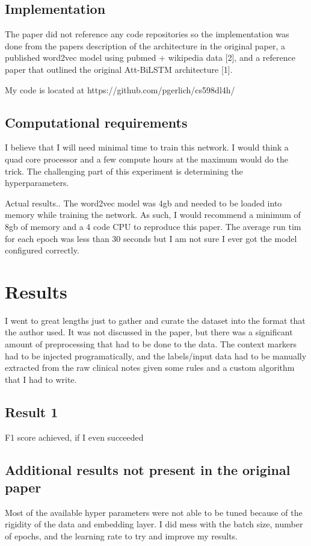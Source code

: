 \documentclass[11pt,a4paper]{article}
\begin{document}
\subsection{Implementation}
The paper did not reference any code repositories so the implementation was done from the papers description of the architecture in the original paper, a published word2vec model using pubmed + wikipedia data [2], and a reference paper that outlined the original Att-BiLSTM architecture [1].

My code is located at https://github.com/pgerlich/cs598dl4h/

\subsection{Computational requirements}

I believe that I will need minimal time to train this network. I would think a quad core processor and a few compute hours at the maximum would do the trick. The challenging part of this experiment is determining the hyperparameters.

Actual results..
The word2vec model was 4gb and needed to be loaded into memory while training the network. As such, I would recommend a minimum of 8gb of memory and a 4 code CPU to reproduce this paper. The average run tim for each epoch was less than 30 seconds but I am not sure I ever got the model configured correctly.

\section{Results}
I went to great lengths just to gather and curate the dataset into the format that the author used. It was not discussed in the paper, but there was a significant amount of preprocessing that had to be done to the data. The context markers had to be injected programatically, and the labels/input data had to be manually extracted from the raw clinical notes given some rules and a custom algorithm that I had to write.

\subsection{Result 1}

F1 score achieved, if I even succeeded


\subsection{Additional results not present in the original paper}
Most of the available hyper parameters were not able to be tuned because of the rigidity of the data and embedding layer. I did mess with the batch size, number of epochs, and the learning rate to try and improve my results. 
\end{document}
